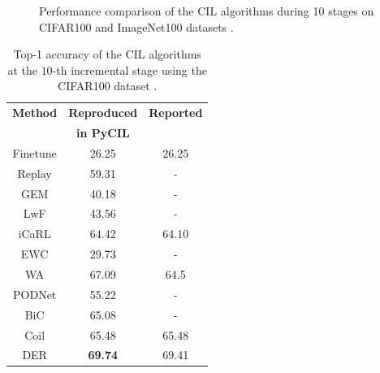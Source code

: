 \begin{figure}%
	\centering
	\hfill
	\caption{Performance comparison of the CIL algorithms during 10 stages on CIFAR100 and ImageNet100 datasets \cite{zhou2021pycil}.}%
	\label{fig:cil-comaprison}%
\end{figure}

\begin{table}
    \centering
    \begin{tabular}{c c c} 
     \hline
     \textbf{Method} & \textbf{Reproduced} & \textbf{Reported} \\
     & \textbf{in PyCIL}\\
     \hline
     \hline
     Finetune & 26.25& 26.25 \\

    Replay & 59.31 & - \\ 

    GEM & 40.18 & - \\ 

    LwF & 43.56 & - \\ 

    iCaRL & 64.42 & 64.10 \\ 

    EWC & 29.73 & - \\ 

    WA & 67.09 & 64.5 \\ 

    PODNet & 55.22 & - \\ 

    BiC & 65.08 & - \\ 

    Coil & 65.48 & 65.48 \\ 

    DER & \textbf{69.74} & 69.41 \\ 
    \hline
    \end{tabular}
    \caption{Top-1 accuracy of the CIL algorithms at the $10$-th incremental stage using the CIFAR100 dataset \cite{zhou2021pycil}.}
    \label{table:cil-results}
    \end{table}

